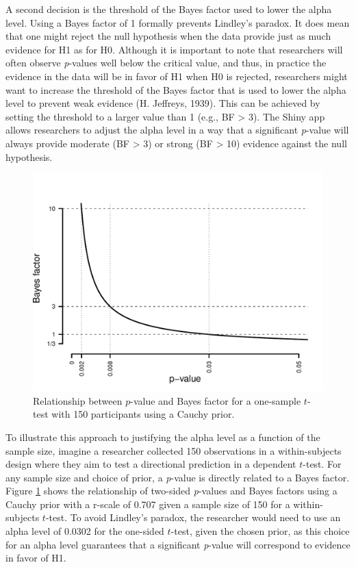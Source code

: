 \documentclass[
  english,
  ,man, a4paper,floatsintext]{apa6}
\begin{document}
A second decision is the threshold of the Bayes factor used to lower the alpha level. Using a Bayes factor of 1 formally prevents Lindley's paradox. It does mean that one might reject the null hypothesis when the data provide just as much evidence for H1 as for H0. Although it is important to note that researchers will often observe \emph{p}-values well below the critical value, and thus, in practice the evidence in the data will be in favor of H1 when H0 is rejected, researchers might want to increase the threshold of the Bayes factor that is used to lower the alpha level to prevent weak evidence (H. Jeffreys, 1939). This can be achieved by setting the threshold to a larger value than 1 (e.g., BF \textgreater{} 3). The Shiny app allows researchers to adjust the alpha level in a way that a significant \emph{p}-value will always provide moderate (BF \textgreater{} 3) or strong (BF \textgreater{} 10) evidence against the null hypothesis.

\begin{figure}
\centering
\includegraphics{Justify_in_Practice_files/figure-latex/Lindley150-1.pdf}
\caption{\label{fig:Lindley150}Relationship between \(p\)-value and Bayes factor for a one-sample \(t\)-test with 150 participants using a Cauchy prior.}
\end{figure}

To illustrate this approach to justifying the alpha level as a function of the sample size, imagine a researcher collected 150 observations in a within-subjects design where they aim to test a directional prediction in a dependent \(t\)-test. For any sample size and choice of prior, a \emph{p}-value is directly related to a Bayes factor. Figure \ref{fig:Lindley150} shows the relationship of two-sided \emph{p}-values and Bayes factors using a Cauchy prior with a r-scale of 0.707 given a sample size of 150 for a within-subjects \(t\)-test. To avoid Lindley's paradox, the researcher would need to use an alpha level of 0.0302 for the one-sided \(t\)-test, given the chosen prior, as this choice for an alpha level guarantees that a significant \emph{p}-value will correspond to evidence in favor of H1.
\end{document}
